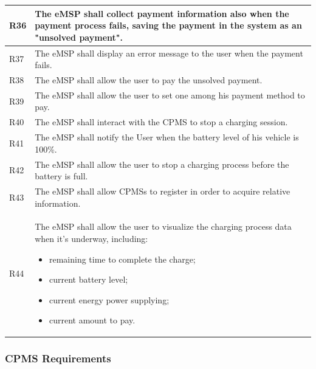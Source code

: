 \documentclass{Configuration_Files/PoliMi3i_thesis}
\begin{document}
\begin{xltabular}{\textwidth}{| >{}l | X |}
R36 &
    The eMSP shall collect payment information also when the payment process fails, saving the payment in the system as an "unsolved payment".\B\\
\hline
    
R37 &
    The eMSP shall display an error message to the user when the payment fails.\B\\
\hline
    
R38 &
    The eMSP shall allow the user to pay the unsolved payment.\B\\
\hline
    
R39 &
    The eMSP shall allow the user to set one among his payment method to pay.\B\\
\hline

R40 &
    The eMSP shall interact with the CPMS to stop a charging session.\B\\
\hline

R41 &
    The eMSP shall notify the User when the battery level of his vehicle is 100\%. \B\\
\hline

R42 &
    The eMSP shall allow the user to stop a charging process before the battery is full.\B\\
    \hline

    
\hline
R43 &
    The eMSP shall allow CPMSs to register in order to acquire relative information. \B\\
\hline
 
R44 &
    The eMSP shall allow the user to visualize the charging process data when it’s underway, including:
    \begin{itemize}
        \item remaining time to complete the charge;
        \item current battery level;
        \item current energy power supplying;
        \item current amount to pay.
    \end{itemize}\B\\
\hline
\end{xltabular}

\subsubsection{CPMS Requirements}
\end{document}
